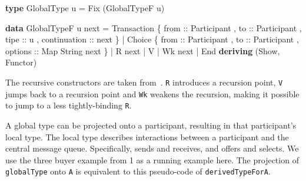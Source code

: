 \documentclass[runningheads]{llncs}
\newenvironment{Shaded}{}{}
\newcommand{\KeywordTok}[1]{\textcolor[rgb]{0.00,0.44,0.13}{\textbf{#1}}}
\newcommand{\DataTypeTok}[1]{\textcolor[rgb]{0.56,0.13,0.00}{#1}}
\newcommand{\OtherTok}[1]{\textcolor[rgb]{0.00,0.44,0.13}{#1}}
\newcommand{\FunctionTok}[1]{\textcolor[rgb]{0.02,0.16,0.49}{#1}}
\newcommand{\NormalTok}[1]{#1}
\begin{document}
\begin{Shaded}
\begin{Highlighting}[]
\KeywordTok{type} \DataTypeTok{GlobalType}\NormalTok{ u }\FunctionTok{=} \DataTypeTok{Fix}\NormalTok{ (}\DataTypeTok{GlobalTypeF}\NormalTok{ u)}

\KeywordTok{data} \DataTypeTok{GlobalTypeF}\NormalTok{ u next}
    \FunctionTok{=} \DataTypeTok{Transaction} 
\NormalTok{        \{}\OtherTok{ from ::} \DataTypeTok{Participant}
\NormalTok{        ,}\OtherTok{ to ::} \DataTypeTok{Participant}
\NormalTok{        ,}\OtherTok{ tipe ::}\NormalTok{ u}
\NormalTok{        ,}\OtherTok{ continuation ::}\NormalTok{  next }
\NormalTok{        \} }
    \FunctionTok{|} \DataTypeTok{Choice} 
\NormalTok{        \{}\OtherTok{ from ::} \DataTypeTok{Participant}
\NormalTok{        ,}\OtherTok{ to ::} \DataTypeTok{Participant}
\NormalTok{        ,}\OtherTok{ options ::} \DataTypeTok{Map} \DataTypeTok{String}\NormalTok{ next }
\NormalTok{        \}}
    \FunctionTok{|} \DataTypeTok{R}\NormalTok{ next}
    \FunctionTok{|} \DataTypeTok{V}
    \FunctionTok{|} \DataTypeTok{Wk}\NormalTok{ next}
    \FunctionTok{|} \DataTypeTok{End}
    \KeywordTok{deriving}\NormalTok{ (}\DataTypeTok{Show}\NormalTok{, }\DataTypeTok{Functor}\NormalTok{)}
\end{Highlighting}
\end{Shaded}

The recursive constructors are taken from~\cite{HYC08}. \texttt{R} introduces a
recursion point, \texttt{V} jumps back to a recursion point and
\texttt{Wk} weakens the recursion, making it possible to jump to a less
tightly-binding \texttt{R}.

A global type can be projected onto a participant, resulting in that
participant's local type. The local type describes interactions between
a participant and the central message queue. Specifically, sends and
receives, and offers and selects. We use the three buyer example from 1
as a running example here. The projection of \texttt{globalType} onto
\texttt{A} is equivalent to this pseudo-code of
\texttt{derivedTypeForA}.
\end{document}

